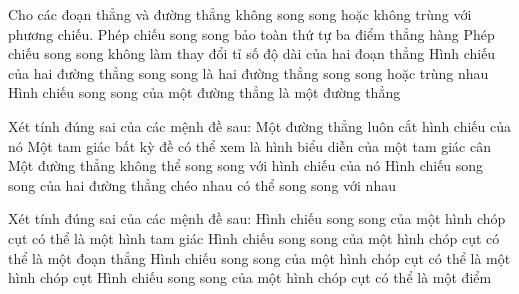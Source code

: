 \begin{ex}%
	Cho các  đoạn thẳng và đường thẳng không song song hoặc không trùng với phương chiếu.
	\choiceTF 
		{\True Phép chiếu song song bảo toàn thứ tự ba điểm thẳng hàng} 
		{Phép chiếu song song không làm thay đổi tỉ  số độ dài của hai đoạn thẳng}
		{\True Hình chiếu của hai đường  thẳng song song là hai đường thẳng song song hoặc trùng nhau}
		{\True Hình chiếu song  song của một đường thẳng là một đường thẳng}
\end{ex}

\begin{ex}%
	 Xét tính đúng sai của các mệnh đề sau:
	\choiceTF 
		{Một đường thẳng luôn cắt hình  chiếu của nó}
		{\True Một tam giác bất  kỳ đề có thể xem là hình biểu diễn của một tam giác cân}
		{Một đường thẳng không thể song song với hình chiếu của  nó}
		{\True Hình chiếu song song của hai  đường thẳng chéo nhau có thể song song với nhau}
\end{ex}

\begin{ex}%
	Xét tính đúng sai của các mệnh đề sau: 
	 \choiceTF
		{\True Hình chiếu song song của một  hình chóp cụt có thể là một hình tam giác}
		{Hình chiếu song song của  một hình chóp cụt có thể là một đoạn thẳng}
		{Hình chiếu song song của một hình chóp cụt có thể là một hình chóp  cụt}
		{Hình chiếu song song  của một hình chóp cụt có thể là một điểm}
\end{ex}

